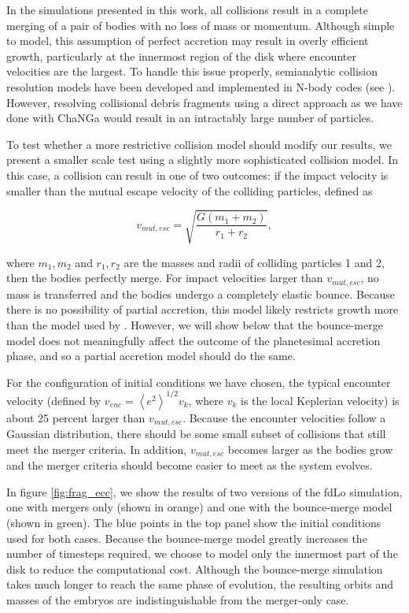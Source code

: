 \documentclass[twocolumn]{aastex63}
\begin{document}
In the simulations presented in this work, all collisions result in a complete merging of a pair of bodies with no loss of mass or momentum. Although simple to model, this assumption of perfect accretion may result in overly efficient growth, particularly at the innermost region of the disk where encounter velocities are the largest. To handle this issue properly, semianalytic collision resolution models have been developed and implemented in N-body codes (see \citet{leinhardt12}). However, resolving collisional debris fragments using a direct approach as we have done with {\sc ChaNGa} would result in an intractably large number of particles.

To test whether a more restrictive collision model should modify our results, we present a smaller scale test using a slightly more sophisticated collision model. In this case, a collision can result in one of two outcomes: if the impact velocity is smaller than the mutual escape velocity of the colliding particles, defined as

\begin{equation}\label{eq:v_mut}
	v_{mut, esc} = \sqrt{\frac{G (m_{1} + m_{2})}{r_{1} + r_{2}}},
\end{equation}

\noindent where $m_{1}, m_{2}$ and $r_{1}, r_{2}$ are the masses and radii of colliding particles 1 and 2, then the bodies perfectly merge. For impact velocities larger than $v_{mut, esc}$, no mass is transferred and the bodies undergo a completely elastic bounce. Because there is no possibility of partial accretion, this model likely restricts growth more than the model used by \citet{leinhardt12}. However, we will show below that the bounce-merge model does not meaningfully affect the outcome of the planetesimal accretion phase, and so a partial accretion model should do the same.

For the configuration of initial conditions we have chosen, the typical encounter velocity (defined by $v_{enc} = \left< e^{2} \right>^{1/2} v_{k}$, where $v_{k}$ is the local Keplerian velocity) is about 25 percent larger than $v_{mut, esc}$. Because the encounter velocities follow a Gaussian distribution, there should be some small subset of collisions that still meet the merger criteria. In addition, $v_{mut, esc}$ becomes larger as the bodies grow and the merger criteria should become easier to meet as the system evolves.

In figure \ref{fig:frag_ecc}, we show the results of two versions of the fdLo simulation, one with mergers only (shown in orange) and one with the bounce-merge model (shown in green). The blue points in the top panel show the initial conditions used for both cases. Because the bounce-merge model greatly increases the number of timesteps required, we choose to model only the innermost part of the disk to reduce the computational cost. Although the bounce-merge simulation takes much longer to reach the same phase of evolution, the resulting orbits and masses of the embryos are indistinguishable from the merger-only case.
\end{document}
